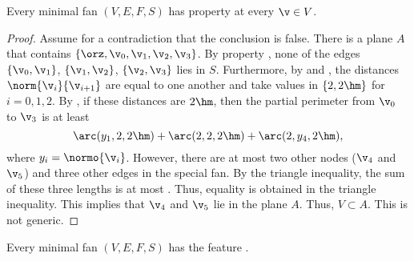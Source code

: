 \begin{lemma}[] Every minimal fan $(V,E,F,S)$ has property
 at every $\v\in V$.
\end{lemma}

\begin{proof} %
Assume for a contradiction that the conclusion is false.  There is a
plane $A$ that contains $\{\orz,\v_0,\v_1,\v_2,\v_3\}$.  By property
, none of the edges $\{\v_0,\v_1\}$, $\{\v_1,\v_2\}$,
$\{\v_2,\v_3\}$ lies in $S$.  Furthermore, by 
and , the distances $\norm{\v_i}{\v_{i+1}}$ are equal
to one another and take values in $\{2,2\hm\}$ for $i=0,1,2$.  By
, if these distances are $2\hm$, then the partial
perimeter from $\v_0$ to $\v_3$ is at least
\begin{equation}\label{eqn:3side}
\arc(y_1,2,2\hm)+\arc(2,2,2\hm)+\arc(2,y_4,2\hm),
\end{equation}
where $y_i=\normo{\v_i}$.  However, there are at most two other nodes
($\v_4$ and $\v_5$) and three other edges in the special fan.  By the
triangle inequality, the sum of these three lengths is at most
.  Thus, equality is obtained in the triangle
inequality.  This implies that $\v_4$ and $\v_5$ lie in the plane $A$.
Thus, $V\subset A$.  This is not generic.
\end{proof}

\begin{lemma}[] 
Every minimal fan $(V,E,F,S)$ has the feature .
\end{lemma}

